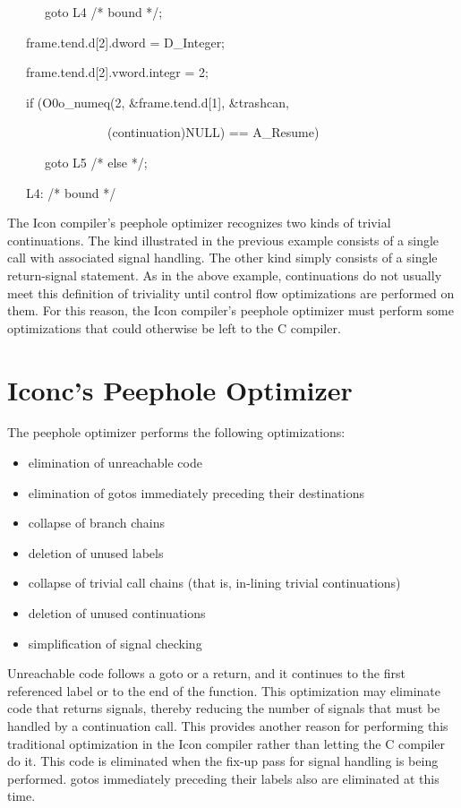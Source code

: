 {\ttfamily\mdseries
\ \ \ \ \ \ goto L4 /* bound */;}

{\ttfamily\mdseries
\ \ \ frame.tend.d[2].dword = D\_Integer;}

{\ttfamily\mdseries
\ \ \ frame.tend.d[2].vword.integr = 2;}

{\ttfamily\mdseries
\ \ \ if (O0o\_numeq(2, \&frame.tend.d[1], \&trashcan,}

{\ttfamily\mdseries
\ \ \ \ \ \ \ \ \ \ \ \ \ \ \ \ (continuation)NULL) == A\_Resume)}

{\ttfamily\mdseries
\ \ \ \ \ \ goto L5 /* else */;}

{\ttfamily\mdseries
\ \ \ L4: /* bound */}


The Icon compiler's peephole optimizer recognizes two kinds of trivial
continuations. The kind illustrated in the previous example consists
of a single call with associated signal handling. The other kind
simply consists of a single return-signal statement. As in the above
example, continuations do not usually meet this definition of
triviality until control flow optimizations are performed on them. For
this reason, the Icon compiler's peephole optimizer must perform some
optimizations that could otherwise be left to the C compiler.


\section{Iconc's Peephole Optimizer}

The peephole optimizer performs the following optimizations: 

\liststyleLxxxiv
\begin{itemize}
\item 
elimination of unreachable code 
\item 
elimination of gotos immediately preceding their destinations 
\item 
collapse of branch chains 
\item 
deletion of unused labels 
\item 
collapse of trivial call chains (that is, in-lining trivial continuations) 
\item 
deletion of unused continuations 
\item 
simplification of signal checking 
\end{itemize}

Unreachable code follows a goto or a return, and it continues to the
first referenced label or to the end of the function. This
optimization may eliminate code that returns signals, thereby reducing
the number of signals that must be handled by a continuation
call. This provides another reason for performing this traditional
optimization in the Icon compiler rather than letting the C compiler
do it. This code is eliminated when the fix-up pass for signal
handling is being performed. gotos immediately preceding their labels
also are eliminated at this time.

